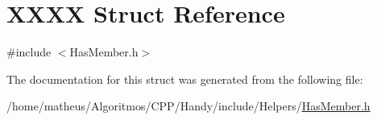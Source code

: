 \hypertarget{structXXXX}{}\section{X\+X\+XX Struct Reference}
\label{structXXXX}


{\ttfamily \#include $<$Has\+Member.\+h$>$}



The documentation for this struct was generated from the following file\+:\begin{DoxyCompactItemize}
\item 
/home/matheus/\+Algoritmos/\+C\+P\+P/\+Handy/include/\+Helpers/\hyperlink{HasMember_8h}{Has\+Member.\+h}\end{DoxyCompactItemize}
